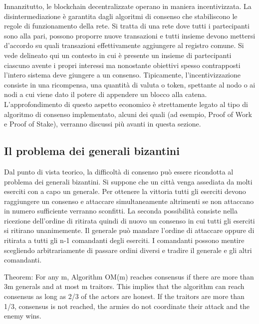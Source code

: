 Innanzitutto, le blockchain decentralizzate operano in maniera incentivizzata. La disintermediazione è garantita dagli algoritmi di consenso che stabiliscono le regole di funzionamento della rete. Si tratta di una rete dove tutti i partecipanti sono alla pari, possono proporre nuove transazioni e tutti insieme devono mettersi d'accordo su quali transazioni effettivamente aggiungere al registro comune. Si vede delineato qui un contesto in cui è presente un insieme di partecipanti ciascuno avente i propri interessi ma nonostante obiettivi spesso contrapposti l'intero sistema deve giungere a un consenso. Tipicamente, l'incentivizzazione consiste in una ricompensa, una quantità di valuta o token, spettante al nodo o ai nodi a cui viene dato il potere di appendere un blocco alla catena. L’approfondimento di questo aspetto economico è strettamente legato al tipo di algoritmo di consenso implementato, alcuni dei quali (ad esempio, Proof of Work e Proof of Stake), verranno discussi più avanti in questa sezione.


\subsection{Il problema dei generali bizantini}

Dal punto di vista teorico, la difficoltà di consenso può essere ricondotta al problema dei generali bizantini. Si suppone che un città venga assediata da molti eserciti con a capo un generale. Per ottenere la vittoria tutti gli eserciti devono raggiungere un consenso e attaccare simultaneamente altrimenti se non attaccano in numero sufficiente verranno sconfitti. La seconda possibilità consiste nella ricezione dell'ordine di ritirata quindi di nuovo un consenso in cui tutti gli eserciti si ritirano unanimemente. Il generale può mandare l'ordine di attaccare oppure di ritirata a tutti gli n-1 comandanti degli eserciti. I comandanti possono mentire scegliendo arbitrariamente di passare ordini diversi e tradire il generale e gli altri comandanti. 

Theorem: For any m, Algorithm OM(m) reaches consensus if there are more than 3m generals and at most m traitors.
This implies that the algorithm can reach consensus as long as 2/3 of the actors are honest. If the traitors are more than 1/3, consensus is not reached, the armies do not coordinate their attack and the enemy wins.

